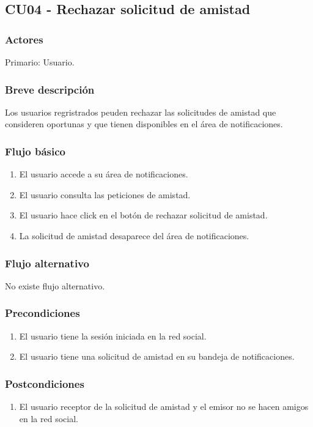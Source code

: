\documentclass[12pt, a4paper, titlepage]{article}
\begin{document}
\subsection{CU04 - Rechazar solicitud de amistad}
\subsubsection{Actores}
Primario: Usuario.
\subsubsection{Breve descripción}
Los usuarios regristrados peuden rechazar las solicitudes de amistad que consideren oportunas y que tienen disponibles en el área de notificaciones.
\subsubsection{Flujo básico}
\begin{enumerate}
	\item El usuario accede a su área de notificaciones.
	\item El usuario consulta las peticiones de amistad.
	\item El usuario hace click en el botón de rechazar solicitud de amistad.
	\item La solicitud de amistad desaparece del área de notificaciones.
\end{enumerate}
\subsubsection{Flujo alternativo}
No existe flujo alternativo.
\subsubsection{Precondiciones}
\begin{enumerate}
	\item El usuario tiene la sesión iniciada en la red social.
	\item El usuario tiene una solicitud de amistad en su bandeja de notificaciones.
\end{enumerate}
\subsubsection{Postcondiciones}
\begin{enumerate}
	\item El usuario receptor de la solicitud de amistad y el emisor no se hacen amigos en la red social.
\end{enumerate}
\end{document}
